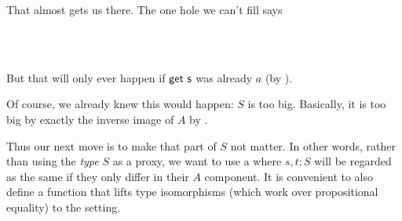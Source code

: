 \documentclass[sigplan,review,anonymous]{acmart}
\begin{document}
That almost gets us there. The one hole we can't fill says
\begin{code}%
\>[2][@{}l@{\AgdaIndent{1}}]%
\>[4]\<%
\\
\>[4][@{}l@{\AgdaIndent{0}}]%
\>[6]\AgdaSpace{}%
\AgdaSymbol{:}\AgdaSpace{}%
\AgdaSymbol{\{}\AgdaSpace{}%
\AgdaSymbol{:}\AgdaSpace{}%
\AgdaSymbol{\}}\AgdaSpace{}%
\AgdaSymbol{\{}\AgdaSpace{}%
\AgdaSymbol{:}\AgdaSpace{}%
\AgdaSymbol{\}}\AgdaSpace{}%
\AgdaSpace{}%
\AgdaSpace{}%
\AgdaSpace{}%
\AgdaSpace{}%
\AgdaSpace{}%
\AgdaSpace{}%
\<%
\\
%
\>[6]\AgdaSpace{}%
\AgdaSymbol{=}\AgdaSpace{}%
\AgdaSymbol{\{!!\}}\<%
\end{code}
But that will only ever happen if $\AgdaFunction{get s}$ was already $a$ (by
).

Of course, we already knew this would happen: $S$ is too big. Basically, it is
too big by exactly the inverse image of $A$ by .

Thus our next move is to make that part of $S$ not matter. In other words,
rather than using the \emph{type} $S$ as a proxy, we want to use a
 where $s, t : S$ will be regarded as the same if they
only differ in their $A$ component.  It is convenient to also define a
function  that lifts type isomorphisms (which work over
propositional equality) to the  setting.
\end{document}
